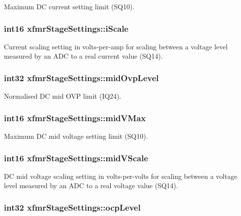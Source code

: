 Maximum D\-C current setting limit (S\-Q10). \hypertarget{a00010_a3b4f123000ae32ca041c6286e5c92fd4}{
\subsubsection[{i\-Scale}]{\setlength{\rightskip}{0pt plus 5cm}int16 xfmr\-Stage\-Settings\-::i\-Scale}}\label{a00010_a3b4f123000ae32ca041c6286e5c92fd4}
Current scaling setting in volts-\/per-\/amp for scaling between a voltage level measured by an A\-D\-C to a real current value (S\-Q14). \hypertarget{a00010_a40270e88484faa165e3e73f45c08326a}{
\subsubsection[{mid\-Ovp\-Level}]{\setlength{\rightskip}{0pt plus 5cm}int32 xfmr\-Stage\-Settings\-::mid\-Ovp\-Level}}\label{a00010_a40270e88484faa165e3e73f45c08326a}
Normalised D\-C mid O\-V\-P limit (I\-Q24). \hypertarget{a00010_a251fa7af71c610bf2b193afde33e1338}{
\subsubsection[{mid\-V\-Max}]{\setlength{\rightskip}{0pt plus 5cm}int16 xfmr\-Stage\-Settings\-::mid\-V\-Max}}\label{a00010_a251fa7af71c610bf2b193afde33e1338}
Maximum D\-C mid voltage setting limit (S\-Q10). \hypertarget{a00010_a44cb584d774e345422c57cc155b65d0c}{
\subsubsection[{mid\-V\-Scale}]{\setlength{\rightskip}{0pt plus 5cm}int16 xfmr\-Stage\-Settings\-::mid\-V\-Scale}}\label{a00010_a44cb584d774e345422c57cc155b65d0c}
D\-C mid voltage scaling setting in volts-\/per-\/volts for scaling between a voltage level measured by an A\-D\-C to a real voltage value (S\-Q14). \hypertarget{a00010_a99d85a680a0b0b7f1858d77a3ac216b3}{
\subsubsection[{ocp\-Level}]{\setlength{\rightskip}{0pt plus 5cm}int32 xfmr\-Stage\-Settings\-::ocp\-Level}}\label{a00010_a99d85a680a0b0b7f1858d77a3ac216b3}
